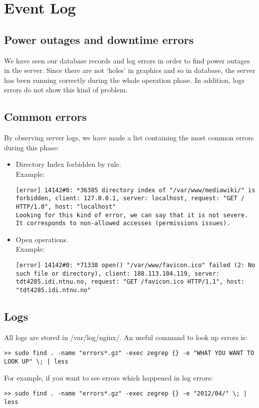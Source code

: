\section{Event Log}
\subsection{ Power outages and downtime errors}
We have seen our database records and log errors in order to find power outages in the server. Since there are not ‘holes’ in graphics and so in database, the server has been running correctly during the whole operation phase. In addition, logs errors do not show this kind of problem.
\subsection{Common errors}
By observing server logs, we have made a list containing the most common errors during this phase:
\begin{itemize}
\item{Directory Index forbidden by rule. \\}
Example:
\begin{lstlisting}
[error] 14142#0: *36385 directory index of "/var/www/mediawiki/" is forbidden, client: 127.0.0.1, server: localhost, request: "GET / HTTP/1.0", host: "localhost"
Looking for this kind of error, we can say that it is not severe.  It corresponds to non-allowed accesses (permissions issues).
\end{lstlisting}
\item{Open operations. \\}
Example:
\begin{lstlisting}
[error] 14142#0: *71338 open() "/var/www/favicon.ico" failed (2: No such file or directory), client: 188.113.104.119, server: tdt4285.idi.ntnu.no, request: "GET /favicon.ico HTTP/1.1", host: "tdt4285.idi.ntnu.no"
\end{lstlisting}
\end{itemize}
\subsection{Logs}
All logs are stored in /var/log/nginx/. An useful command to look up errors is:
\begin{lstlisting}
>> sudo find . -name "errors*.gz" -exec zegrep {} -e "WHAT YOU WANT TO LOOK UP" \; | less
\end{lstlisting}
For example, if you want to see errors which happened in log errors:
\begin{lstlisting}
>> sudo find . -name "errors*.gz" -exec zegrep {} -e "2012/04/" \; | less
\end{lstlisting}
\pagebreak
